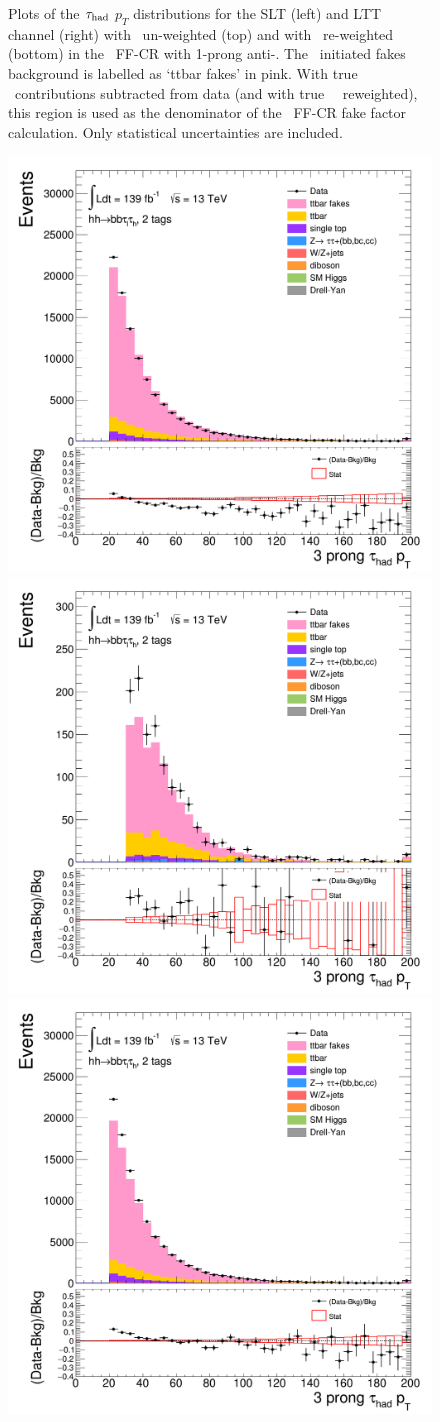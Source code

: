 \begin{figure}[htbp]
\caption{Plots of the $\tau_{\mathrm{had}}$ $p_T$ distributions for the SLT (left) and LTT channel (right) with \ttbar\ un-weighted (top)
and with \ttbar\ re-weighted (bottom) in the \ttbar\ FF-CR with 1-prong anti-\tauhad. 
The \ttbar\ initiated fakes background is labelled as `ttbar fakes' in pink.
With true \tauhad\ contributions subtracted from data (and with true \tauhad\ \ttbar\ reweighted),  
this region is used as the denominator of the \ttbar\ FF-CR fake factor calculation. 
Only statistical uncertainties are included.}
\label{fig:ttbarCR_1}
\end{figure} 
\begin{figure}[htbp]
\centering
\includegraphics[width=.45\textwidth]{DiHiggs/plots/FF_CRs/ttbarCR_SLT/HNone/BDTVarsHighMbb/2/C_2tag2pjet_0ptv_TauPt3P.png}
\includegraphics[width=.45\textwidth]{DiHiggs/plots/FF_CRs/ttbarCR_LTT/HNone/BDTVarsHighMbb/2/C_2tag2pjet_0ptv_TauPt3P.png}\\
\includegraphics[width=.45\textwidth]{DiHiggs/plots/FF_CRs/ttbarCR_SLT_weighted/HNone/BDTVarsHighMbb/2/C_2tag2pjet_0ptv_TauPt3P.png}

\end{figure}
